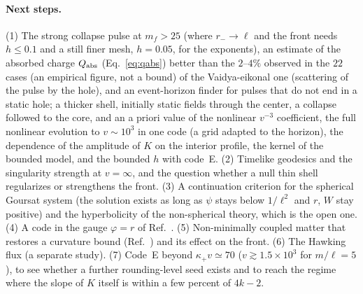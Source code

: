 \documentclass[11pt]{article}
\begin{document}
\paragraph{Next steps.} (1) The strong collapse pulse at $m_f>25$ (where $r_-\to\ell$ and the front needs $h\le0.1$ and a still finer mesh, $h=0.05$, for the exponents), an estimate of the absorbed charge $Q_{\rm abs}$ (Eq.~\eqref{eq:qabs}) better than the $2$--$4\%$ observed in the $22$ cases (an empirical figure, not a bound) of the Vaidya-eikonal one (scattering of the pulse by the hole), and an event-horizon finder for pulses that do not end in a static hole; a thicker shell, initially static fields through the center, a collapse followed to the core, and an a priori value of the nonlinear $v^{-3}$ coefficient, the full nonlinear evolution to $v\sim10^{3}$ in one code (a grid adapted to the horizon), the dependence of the amplitude of $K$ on the interior profile, the kernel of the bounded model, and the bounded $h$ with code~E. (2) Timelike geodesics and the singularity strength at $v=\infty$, and the question whether a null thin shell regularizes or strengthens the front. (3) A continuation criterion for the spherical Goursat system (the solution exists as long as $\psi$ stays below $1/\ell^{2}$ and $r$, $W$ stay positive) and the hyperbolicity of the non-spherical theory, which is the open one. (4) A code in the gauge $\varphi=r$ of Ref.~\cite{BuenoCanoHennigarMurcia2025}. (5) Non-minimally coupled matter that restores a curvature bound (Ref.~\cite{BuenoHennigarMurciaVicenteCano2026}) and its effect on the front. (6) The Hawking flux (a separate study). (7) Code~E beyond $\kappa_+v\simeq70$ ($v\gtrsim1.5\times10^{3}$ for $m/\ell=5$), to see whether a further rounding-level seed exists and to reach the regime where the slope of $K$ itself is within a few percent of $4k-2$.
\end{document}
